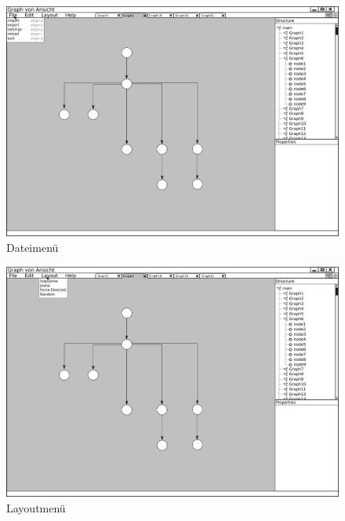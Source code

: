 \begin{figure}[ht]
  \centering
  \includegraphics[width=380pt]{resourcen/gui_view_filemenu.png}
  \caption{Dateimenü}
  \label{fig:gui_view_filemenu}
\end{figure}

\begin{figure}[ht]
  \centering
  \includegraphics[width=380pt]{resourcen/gui_view_layoutmenu.png}
  \caption{Layoutmenü}
  \label{fig:gui_view_layoutmenu}
\end{figure}



